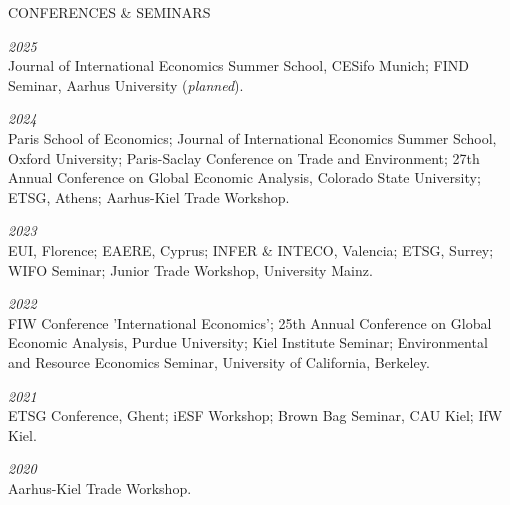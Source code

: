 \documentclass{article}
\begin{document}

\begin{minipage}[t]{0.12\textwidth}
    {\selectfont CONFERENCES \& SEMINARS} \\
\end{minipage}
\hspace{5mm}
\begin{minipage}[t]{0.8\textwidth}
    \textit{2025} \\
    Journal of International Economics Summer School, CESifo Munich; FIND Seminar, Aarhus University (\textit{planned}). \par
    \textit{2024} \\
    Paris School of Economics; Journal of International Economics Summer School, Oxford University; Paris-Saclay Conference on Trade and Environment; 27th Annual Conference on Global Economic Analysis, Colorado State University; ETSG, Athens; Aarhus-Kiel Trade Workshop. \par
    \textit{2023} \\
    EUI, Florence; EAERE, Cyprus; INFER \& INTECO, Valencia; ETSG, Surrey; WIFO Seminar; Junior Trade Workshop, University Mainz. \par
    \textit{2022} \\
    FIW Conference 'International Economics'; 25th Annual Conference on Global Economic Analysis, Purdue University; Kiel Institute Seminar; Environmental and Resource Economics Seminar, University of California, Berkeley.  \par
    \textit{2021} \\
    ETSG Conference, Ghent; iESF Workshop; Brown Bag Seminar, CAU Kiel; IfW Kiel. \par
    \textit{2020} \\
    Aarhus-Kiel Trade Workshop. \par
\end{minipage}
\medskip

\end{document}
